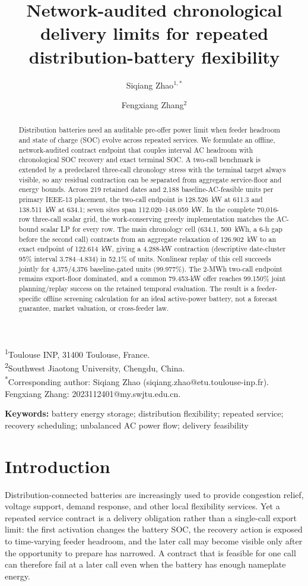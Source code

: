\documentclass[11pt]{article}
\title{Network-audited chronological delivery limits for repeated distribution-battery flexibility}
\author{Siqiang Zhao$^{1,*}$ \and Fengxiang Zhang$^{2}$}
\date{}
\begin{document}
\maketitle

\noindent\textsuperscript{1}Toulouse INP, 31400 Toulouse, France.\\
\textsuperscript{2}Southwest Jiaotong University, Chengdu, China.\\
\textsuperscript{*}Corresponding author: Siqiang Zhao (siqiang.zhao@etu.toulouse-inp.fr).\\
Fengxiang Zhang: 2023112401@my.swjtu.edu.cn.

\begin{abstract}
Distribution batteries need an auditable pre-offer power limit when feeder headroom and state of charge (SOC) evolve across repeated services. We formulate an offline, network-audited contract endpoint that couples interval AC headroom with chronological SOC recovery and exact terminal SOC. A two-call benchmark is extended by a predeclared three-call chronology stress with the terminal target always visible, so any residual contraction can be separated from aggregate service-floor and energy bounds. Across 219 retained dates and 2,188 baseline-AC-feasible units per primary IEEE-13 placement, the two-call endpoint is 128.526~kW at 611.3 and 138.511~kW at 634.1; seven sites span 112.020--148.059~kW. In the complete 70,016-row three-call scalar grid, the work-conserving greedy implementation matches the AC-bound scalar LP for every row. The main chronology cell (634.1, 500~kWh, a 6-h gap before the second call) contracts from an aggregate relaxation of 126.902~kW to an exact endpoint of 122.614~kW, giving a 4.288-kW contraction (descriptive date-cluster 95\% interval 3.784--4.834) in 52.1\% of units. Nonlinear replay of this cell succeeds jointly for 4,375/4,376 baseline-gated units (99.977\%). The 2-MWh two-call endpoint remains export-floor dominated, and a common 79.453-kW offer reaches 99.150\% joint planning/replay success on the retained temporal evaluation. The result is a feeder-specific offline screening calculation for an ideal active-power battery, not a forecast guarantee, market valuation, or cross-feeder law.
\end{abstract}

\noindent\textbf{Keywords:} battery energy storage; distribution flexibility; repeated service; recovery scheduling; unbalanced AC power flow; delivery feasibility

\section{Introduction}
Distribution-connected batteries are increasingly used to provide congestion relief, voltage support, demand response, and other local flexibility services. Yet a repeated service contract is a delivery obligation rather than a single-call export limit: the first activation changes the battery SOC, the recovery action is exposed to time-varying feeder headroom, and the later call may become visible only after the opportunity to prepare has narrowed. A contract that is feasible for one call can therefore fail at a later call even when the battery has enough nameplate energy.
\end{document}
